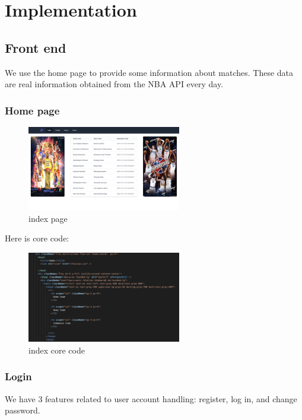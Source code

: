 \documentclass[singlecolumn]{article}
\begin{document}
\section{Implementation}

\subsection{Front end}

We use the home page to provide some information about matches. These data are real information obtained from the NBA API every day.

\subsubsection{Home page}

\begin{figure}[H]
    \centering
    \includegraphics[width=0.6\textwidth]{index.png}
    \caption{index page}
    \label{fig:index}
\end{figure}

Here is core code:

\begin{figure}[H]
    \centering
    \includegraphics[width=0.6\textwidth]{index_code.png}
    \caption{index core code}
    \label{fig:index_code}
\end{figure}

\subsubsection{Login}
We have 3 features related to user account handling: register, log in, and change password. 
\end{document}
